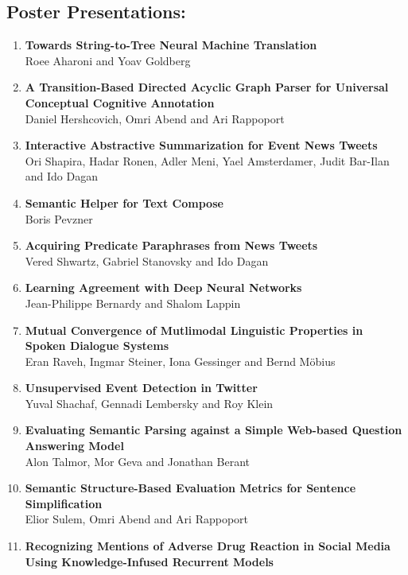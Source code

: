 \documentclass[a0,portrait]{a0poster}
\begin{document}
\subsection*{Poster Presentations:}

{\scriptsize
\begin{multicols}{5}
\begin{enumerate}
\item
\textbf{Towards String-to-Tree Neural Machine Translation}\\
Roee Aharoni and Yoav Goldberg
\item
\textbf{A Transition-Based Directed Acyclic Graph Parser for Universal
Conceptual Cognitive Annotation}\\
Daniel Hershcovich, Omri Abend and Ari Rappoport
\item
\textbf{Interactive Abstractive Summarization for Event News Tweets}\\
Ori Shapira, Hadar Ronen, Adler Meni, Yael Amsterdamer, Judit Bar-Ilan
and Ido Dagan
\item
\textbf{Semantic Helper for Text Compose}\\
Boris Pevzner
\item
\textbf{Acquiring Predicate Paraphrases from News Tweets}\\
Vered Shwartz, Gabriel Stanovsky and Ido Dagan
\item
\textbf{Learning Agreement with Deep Neural Networks}\\
Jean-Philippe Bernardy and Shalom Lappin
\item
\textbf{Mutual Convergence of Mutlimodal Linguistic Properties in
Spoken Dialogue Systems}\\
Eran Raveh, Ingmar Steiner, Iona Gessinger and Bernd M\"obius
\item
\textbf{Unsupervised Event Detection in Twitter}\\
Yuval Shachaf, Gennadi Lembersky and Roy Klein
\item
\textbf{Evaluating Semantic Parsing against a Simple Web-based
Question Answering Model}\\
Alon Talmor, Mor Geva and Jonathan Berant
\item
\textbf{Semantic Structure-Based Evaluation Metrics for Sentence
Simplification}\\
Elior Sulem, Omri Abend and Ari Rappoport
\item
\textbf{Recognizing Mentions of Adverse Drug Reaction in Social Media
Using Knowledge-Infused Recurrent Models}\\

\end{enumerate}
\end{multicols}}
\end{document}
